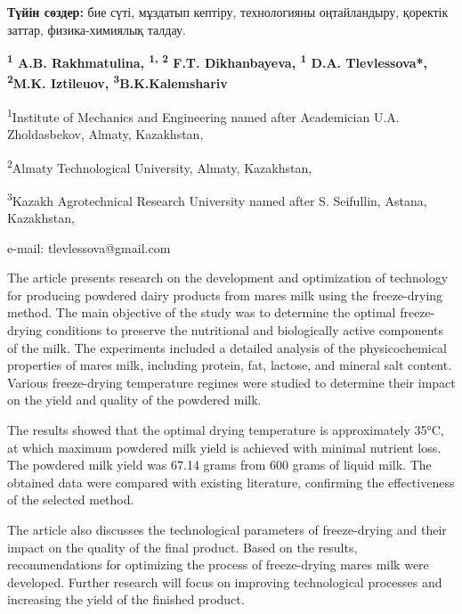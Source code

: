 {\bfseries Түйін сөздер:} бие сүті, мұздатып кептіру, технологияны
оңтайландыру, қоректік заттар, физика-химиялық талдау.

\begin{center}

{\bfseries \textsuperscript{1} A.B. Rakhmatulina, \textsuperscript{1, 2}
F.T. Dikhanbayeva, \textsuperscript{1} D.A. Tlevlessova*,}
{\bfseries \textsuperscript{2}M.K. Iztileuov, \textsuperscript{3}B.K.Kalemshariv}

\textsuperscript{1}Institute of Mechanics and Engineering named after
Academician U.A. Zholdasbekov, Almaty, Kazakhstan,

\textsuperscript{2}Almaty Technological University, Almaty, Kazakhstan,

\textsuperscript{3}Kazakh Agrotechnical Research University named after
S. Seifullin, Astana, Kazakhstan,

e-mail: tlevlessova@gmail.com
\end{center}

The article presents research on the development and optimization of
technology for producing powdered dairy products from
mare\textquotesingle s milk using the freeze-drying method. The main
objective of the study was to determine the optimal freeze-drying
conditions to preserve the nutritional and biologically active
components of the milk. The experiments included a detailed analysis of
the physicochemical properties of mare\textquotesingle s milk, including
protein, fat, lactose, and mineral salt content. Various freeze-drying
temperature regimes were studied to determine their impact on the yield
and quality of the powdered milk.

The results showed that the optimal drying temperature is approximately
35°C, at which maximum powdered milk yield is achieved with minimal
nutrient loss. The powdered milk yield was 67.14 grams from 600 grams of
liquid milk. The obtained data were compared with existing literature,
confirming the effectiveness of the selected method.

The article also discusses the technological parameters of freeze-drying
and their impact on the quality of the final product. Based on the
results, recommendations for optimizing the process of freeze-drying
mare\textquotesingle s milk were developed. Further research will focus
on improving technological processes and increasing the yield of the
finished product.

